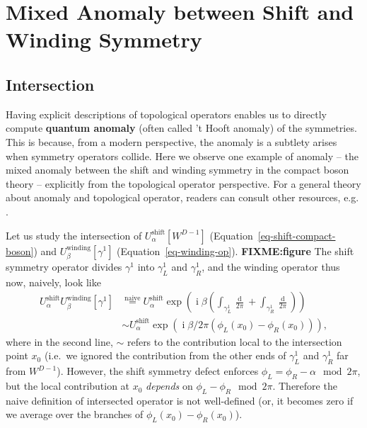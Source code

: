 \documentclass[
  letterpaper,
  DIV=11,
  numbers=noendperiod]{scrreport}
\DeclareMathOperator{\imunit}{i}
\newcommand{\stdim}{D}
\begin{document}
\section{Mixed Anomaly between Shift and Winding
Symmetry}\label{mixed-anomaly-between-shift-and-winding-symmetry}

\subsection{Intersection}\label{intersection}

Having explicit descriptions of topological operators enables us to
directly compute \textbf{quantum anomaly} (often called 't Hooft
anomaly) of the symmetries. This is because, from a modern perspective,
the anomaly is a subtlety arises when symmetry operators collide. Here
we observe one example of anomaly -- the mixed anomaly between the shift
and winding symmetry in the compact boson theory -- explicitly from the
topological operator perspective. For a general theory about anomaly and
topological operator, readers can consult other resources, e.g.
\textcite{TachikawaTasi}.

Let us study the intersection of \(U_\alpha^\text{shift}[W^{\stdim-1}]\)
(Equation~\ref{eq-shift-compact-boson}) and
\(U_\beta^\text{winding}[\gamma^1]\) (Equation~\ref{eq-winding-op}).
\textbf{FIXME:figure} The shift symmetry operator divides \(\gamma^1\)
into \(\gamma^1_L\) and \(\gamma^1_R\), and the winding operator thus
now, naively, look like \[
\begin{aligned}
U^\text{shift}_\alpha U^\text{winding}_\beta[\gamma^1] &\stackrel{\text{naive}}{=} U^\text{shift}_\alpha \exp\left(\imunit\beta \left(\int_{\gamma^1_L}\frac{\mathop{d\phi_L}}{2\pi} + \int_{\gamma^1_R}\frac{\mathop{d\phi_R}}{2\pi}\right)\right)\\
& \sim U^\text{shift}_\alpha \exp\left(\imunit\beta/2\pi (\phi_L(x_0) - \phi_R(x_0)) \right),
\end{aligned}
\] where in the second line, \(\sim\) refers to the contribution local
to the intersection point \(x_0\) (i.e.~we ignored the contribution from
the other ends of \(\gamma^1_L\) and \(\gamma^1_R\) far from
\(W^{\stdim-1}\)). However, the shift symmetry defect enforces
\(\phi_L = \phi_R - \alpha \mod 2\pi\), but the local contribution at
\(x_0\) \emph{depends} on \(\phi_L-\phi_R \mod 2\pi\). Therefore the
naive definition of intersected operator is not well-defined (or, it
becomes zero if we average over the branches of
\(\phi_L(x_0) -\phi_R(x_0)\)).
\end{document}
